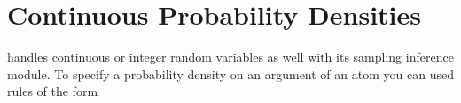 \documentclass[letterpaper,10pt,english]{sphinxmanual}
\begin{document}
\section{Continuous Probability Densities}
\label{\detokenize{index:continuous-probability-densities}}
 handles continuous or integer random variables as well with its sampling inference module.
To specify a probability density on an argument  of an atom  you can used rules of the form

\begin{sphinxVerbatim}[commandchars=\\\{\}]
 
\end{sphinxVerbatim}
\end{document}
